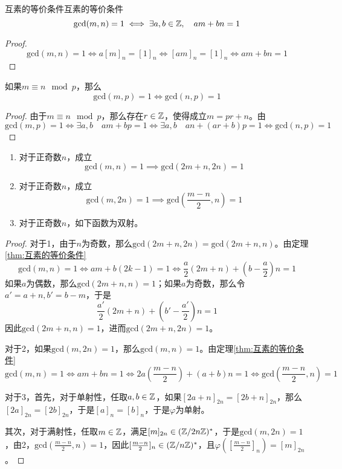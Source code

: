 \begin{theorem}{互素的等价条件}{互素的等价条件}
	$$
	\mathrm{gcd}(m,n)=1\iff \exists a,b\in\mathbb{Z},\quad am+bn=1
	$$
\end{theorem}

\begin{proof}
	$$
	\mathrm{gcd}(m,n)=1\iff a[m]_n=[1]_n\iff[am]_n=[1]_n\iff am+bn=1
	$$
\end{proof}

\begin{proposition}
	如果$m\equiv n\mod p$，那么
	$$
	\mathrm{gcd}(m,p)=1\iff \mathrm{gcd}(n,p)=1
	$$
\end{proposition}

\begin{proof}
	由于$m\equiv n\mod p$，那么存在$r\in\mathbb{Z}$，使得成立$m=pr+n$。由
	$$
	\mathrm{gcd}(m,p)=1
	\iff \exists a,b \quad am+bp=1
	\iff \exists a,b \quad an+(ar+b)p=1
	\iff\mathrm{gcd}(n,p)=1
	$$
\end{proof}

\begin{proposition}
	\begin{enumerate}
		\item 对于正奇数$n$，成立
		$$
		\mathrm{gcd}(m,n)=1\implies\mathrm{gcd}(2m+n,2n)=1
		$$
		\item 对于正奇数$n$，成立
		$$
		\mathrm{gcd}(m,2n)=1\implies\mathrm{gcd}(\frac{m-n}{2},n)=1
		$$
		\item 对于正奇数$n$，如下函数为双射。
	\end{enumerate}
\end{proposition}

\begin{proof}
	对于1，由于$n$为奇数，那么$\mathrm{gcd}(2m+n,2n)=\mathrm{gcd}(2m+n,n)$。由定理\ref{thm:互素的等价条件}
	$$
	\mathrm{gcd}(m,n)=1
	\iff am+b(2k-1)=1
	\iff \frac{a}{2}(2m+n)+(b-\frac{a}{2})n=1
	$$
	如果$a$为偶数，那么$\mathrm{gcd}(2m+n,n)=1$；如果$a$为奇数，那么令$a'=a+n,b'=b-m$，于是
	$$
	\frac{a'}{2}(2m+n)+(b'-\frac{a'}{2})n=1
	$$
	因此$\mathrm{gcd}(2m+n,n)=1$，进而$\mathrm{gcd}(2m+n,2n)=1$。
	
	对于2，如果$\mathrm{gcd}(m,2n)=1$，那么$\mathrm{gcd}(m,n)=1$。由定理\ref{thm:互素的等价条件}
	$$
	\mathrm{gcd}(m,n)=1\iff
	am+bn=1\iff
	2a(\frac{m-n}{2})+(a+b)n=1\iff
	\mathrm{gcd}(\frac{m-n}{2},n)=1
	$$
	
	对于3，首先，对于单射性，任取$a,b\in\mathbb{Z}$，如果$[2a+n]_{2n}=[2b+n]_{2n}$，那么$[2a]_{2n}=[2b]_{2n}$，于是$[a]_n=[b]_n$，于是$\varphi$为单射。
	
	其次，对于满射性，任取$m\in\mathbb{Z}$，满足$[m]_{2n}\in(\mathbb{Z}/2n\mathbb{Z})^*$，于是$\mathrm{gcd}(m,2n)=1$，由2，$\mathrm{gcd}(\frac{m-n}{2},n)=1$，因此$[\frac{m-n}{2}]_{n}\in(\mathbb{Z}/n\mathbb{Z})^*$，且$\varphi([\frac{m-n}{2}]_{n})=[m]_{2n}$。
\end{proof}


